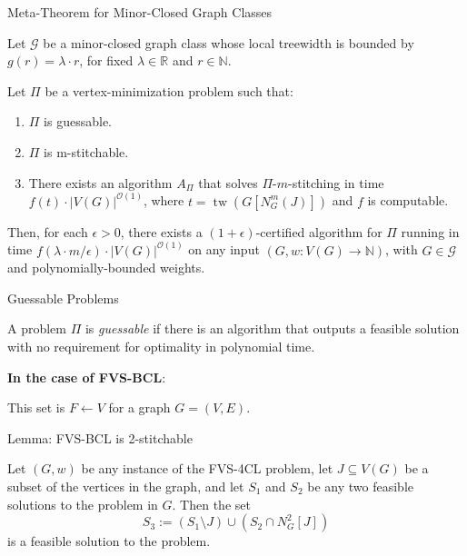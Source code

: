 \documentclass{beamer}
\newcommand{\tw}{\operatorname{tw}}
\begin{document}
\begin{frame}{Meta-Theorem for Minor-Closed Graph Classes}
\begin{definition}
Let $\mathcal{G}$ be a minor-closed graph class whose local treewidth is bounded by $g(r) = \lambda \cdot r$, for fixed $\lambda \in \mathbb{R}$ and $r \in \mathbb{N}$.

Let $\Pi$ be a vertex-minimization problem such that:
\begin{enumerate}
    \item $\Pi$ is guessable.
    \item $\Pi$ is m-stitchable.
    \item There exists an algorithm $A_\Pi$ that solves $\Pi$-$m$-stitching in time 
    $f(t) \cdot |V(G)|^{\mathcal{O}(1)}$, where $t = \tw(G[N_G^m(J)])$ and $f$ is computable.
\end{enumerate}

Then, for each $\epsilon > 0$, there exists a $(1 + \epsilon)$-certified algorithm for $\Pi$ 
running in time $f(\lambda \cdot m / \epsilon) \cdot |V(G)|^{\mathcal{O}(1)}$ on any input 
$(G, w : V(G) \to \mathbb{N})$, with $G \in \mathcal{G}$ and polynomially-bounded weights.
\end{definition}
\end{frame}

\begin{frame}{Guessable Problems}
    \begin{definition}[Guessable]
        A problem $\Pi$ is \emph{guessable} if there is an algorithm that outputs a 
        feasible solution 
        with no requirement for optimality in polynomial time.
    \end{definition}

    \textbf{In the case of FVS-BCL}:

    This set is $F \leftarrow V$ for a graph $G = (V, E)$.
\end{frame}

\begin{frame}{Lemma: FVS-BCL is 2-stitchable}
  \begin{lemma}
    Let $(G, w)$ be any instance of the FVS-4CL problem, let $J \subseteq V(G)$ be a subset
    of the vertices in the graph, and let $S_1$ and $S_2$ be any two feasible solutions 
    to the problem in $G$. Then the set
    \[
    S_3 := (S_1 \setminus J) \cup (S_2 \cap N^{2}_{G}[J])
    \]
    is a feasible solution to the problem.
  \end{lemma}
\end{frame}
\end{document}
